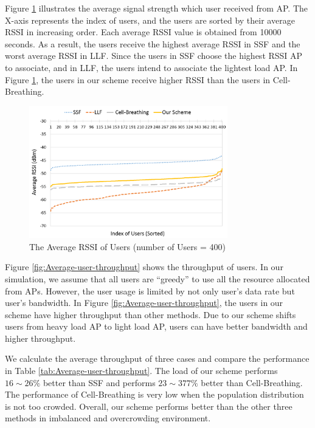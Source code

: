 Figure \ref{fig:Average-user-rssi} illustrates the average signal strength which user received from AP. The X-axis represents the index of users, and the users are sorted by their average RSSI in increasing order. Each average RSSI value is obtained from 10000 seconds. As a result, the users receive the highest average RSSI in SSF and the worst average RSSI in LLF. Since the users in SSF choose the highest RSSI AP to associate, and in LLF, the users intend to associate the lightest load AP. In Figure \ref{fig:Average-user-rssi}, the users in our scheme receive higher RSSI than the users in Cell-Breathing.

\begin{figure}[tbp]
\begin{center}
\includegraphics[width=3.4in]{images/Average_user_RSSI.png}
\end{center}
\caption{The Average RSSI of Users (number of Users = 400)}
\label{fig:Average-user-rssi}
\end{figure}

Figure \ref{fig:Average-user-throughput} shows the throughput of users. In our simulation, we assume that all users are “greedy” to use all the resource allocated from APs. However, the user usage is limited by not only user’s data rate but user’s bandwidth. In Figure \ref{fig:Average-user-throughput}, the users in our scheme have higher throughput than other methods. Due to our scheme shifts users from heavy load AP to light load AP, users can have better bandwidth and higher throughput.

We calculate the average throughput of three cases and compare the performance in Table \ref{tab:Average-user-throughput}. The load of our scheme performs $16\sim26\%$ better than SSF and performs $23\sim377\%$ better than Cell-Breathing. The performance of Cell-Breathing is very low when the population distribution is not too crowded. Overall, our scheme performs better than the other three methods in imbalanced and overcrowding environment.


